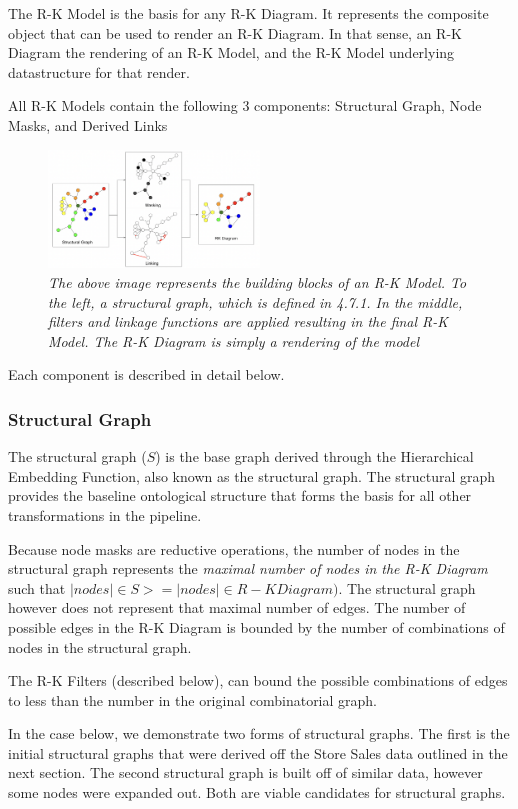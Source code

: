 The R-K Model is the basis for any R-K Diagram. It represents the composite object that can be used to render an R-K Diagram. In that sense, an R-K Diagram the rendering of an R-K Model, and the R-K Model underlying datastructure for that render.

All R-K Models contain the following 3 components: Structural Graph, Node Masks, and Derived Links
\begin{figure}[h]
	\centering
        \includegraphics[width=0.5\textwidth]{images/rkmodel.png}
	\caption{\textit{The above image represents the building blocks of an R-K Model. To the left, a structural graph, which is defined in 4.7.1. In the middle, filters and linkage functions are applied resulting in the final R-K Model. The R-K Diagram is simply a rendering of the model}}
	\label{fig:fig1}
\end{figure}

Each component is described in detail below.

\subsubsection{Structural Graph}

The structural graph ($S$) is the base graph derived through the Hierarchical Embedding Function, also known as the structural graph. The structural graph provides the baseline ontological structure that forms the basis for all other transformations in the pipeline.

Because node masks are reductive operations, the number of nodes in the structural graph represents the \textit{maximal number of nodes in the R-K Diagram} such that $|nodes| \in S >= |nodes| \in R-KDiagram)$. The structural graph however does not represent that maximal number of edges. The number of possible edges in the R-K Diagram is bounded by the number of combinations of nodes in the structural graph.

The R-K Filters (described below), can bound the possible combinations of edges to less than the number in the original combinatorial graph.

In the case below, we demonstrate two forms of structural graphs. The first is the initial structural graphs that were derived off the Store Sales data outlined in the next section. The second structural graph is built off of similar data, however some nodes were expanded out. Both are viable candidates for structural graphs.

